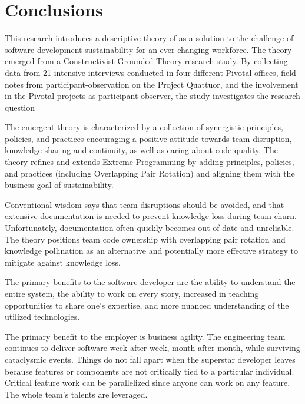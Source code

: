 \section{Conclusions}
This research introduces a descriptive theory of  as a solution to the challenge of software development sustainability for an ever changing workforce. The theory emerged from a Constructivist Grounded Theory research study. By collecting data from 21 intensive interviews conducted in four different Pivotal offices, field notes from participant-observation on the Project Quattuor, and the involvement in the \numberOfObservedProjects{} Pivotal projects as participant-observer, the study investigates the research question 

The emergent theory is characterized by a collection of synergistic principles, policies, and practices encouraging a positive attitude towards team disruption, knowledge sharing and continuity, as well as caring about code quality. The theory refines and extends Extreme Programming by adding principles, policies, and practices (including Overlapping Pair Rotation) and aligning them with the business goal of sustainability.

Conventional wisdom says that team disruptions should be avoided, and that extensive documentation is needed to prevent knowledge loss during team churn. Unfortunately, documentation often quickly becomes out-of-date and unreliable. The theory positions team code ownership with overlapping pair rotation and knowledge pollination as an alternative and potentially more effective strategy to mitigate against knowledge loss.

The primary benefits to the software developer are the ability to understand the entire system, the ability to work on every story, increased in teaching opportunities to share one's expertise, and more nuanced understanding of the utilized technologies. 

The primary benefit to the employer is business agility. The engineering team continues to deliver software week after week, month after month, while surviving cataclysmic events. Things do not fall apart when the superstar developer leaves because features or components are not critically tied to a particular individual. Critical feature work can be parallelized since anyone can work on any feature.  The whole team's talents are leveraged.




